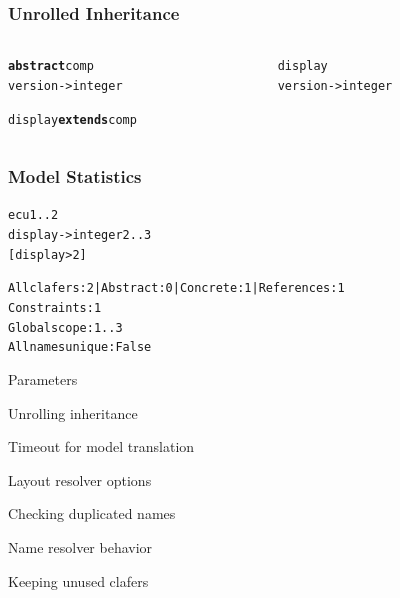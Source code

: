 \documentclass[table,15pt,t]{beamer}
\newcommand{\vmiddle}[1]{
  \vspace{\stretch{1}}
  #1
  \vspace{\stretch{1}}
}
\newcommand{\mlist}[1]{
\vmiddle{
  \begin{list}{}{}
    #1
  \end{list}
  }
}
\newcounter{i}
\begin{document}
\begin{frame}[fragile]
  \frametitle{Unrolled Inheritance}
  \begin{columns}
    \begin{column}{0.5\textwidth}
      \begin{alltt}
        \begin{small}
\textbf{abstract} \textsf{comp}
  \textsf{version} -> \textsf{integer}

\textsf{display} \textbf{extends} \textsf{comp}
        \end{small}
      \end{alltt}
    \end{column}
\pause
    \begin{column}{0.5\textwidth}
      \begin{alltt}
        \begin{small}
\textsf{display}
  \textsf{version} -> \textsf{integer}
        \end{small}
      \end{alltt}
    \end{column}
  \end{columns}
\end{frame}

\begin{frame}[fragile]
  \frametitle{Model Statistics}
      \begin{alltt}
        \begin{small}
\textsf{ecu} 1..2
  \textsf{display} -> \textsf{integer} 2..3
  \textsf{[display > 2]}
        \end{small}
      \end{alltt}
\pause
      \begin{alltt}
        \begin{small}
All clafers: 2 | Abstract: 0 | Concrete: 1 | References: 1
Constraints: 1
Global scope: 1..3
All names unique: False
        \end{small}
      \end{alltt}
\end{frame}

\begin{frame}{Parameters}
 \mlist{
    \item Unrolling inheritance
    \item Timeout for model translation
    \item Layout resolver options
    \item Checking duplicated names
    \item Name resolver behavior
    \item Keeping unused clafers
 }
\end{frame}
\end{document}
